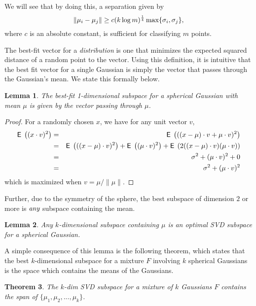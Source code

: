 \documentclass{book}
\newtheorem{theorem}{Theorem}[chapter]
\newtheorem{lemma}[theorem]{Lemma}
\numberwithin{exercise}{chapter}
\begin{document}
We will see that by doing this, a separation given by
\[
\|\mu_i-\mu_j\| \ge c(k\log m)^{\frac{1}{4}}\max\{\sigma_i,\sigma_j\},
\]
where $c$ is an absolute constant, is sufficient for classifying $m$ points.

The best-fit vector for a \emph{distribution}
is one that minimizes the expected squared distance of a random point to the vector.  Using this definition, it is intuitive that
the best fit vector for a single Gaussian is simply the vector that
passes through the Gaussian's mean. We state this formally below.

\begin{lemma}
The best-fit 1-dimensional subspace for a spherical Gaussian with mean $\mu$ is given by the vector passing through $\mu$.
\end{lemma}

\begin{proof}
For a randomly chosen $x$, we have for any unit vector $v$,
\begin{eqnarray*}
\hbox{{\sf E}\;}\left((x\cdot v)^2\right) &=& \hbox{{\sf E}\;}\left(((x-\mu)\cdot v + \mu \cdot v)^2\right) \\
&=& \hbox{{\sf E}\;}\left(((x-\mu)\cdot v)^2\right) + \hbox{{\sf E}\;}\left((\mu \cdot v)^2\right)  + \hbox{{\sf E}\;}\left(2((x-\mu)\cdot v)(\mu \cdot v)\right) \\
&=& \sigma^2 + (\mu \cdot v)^2 + 0 \\
&=& \sigma^2 + (\mu \cdot v)^2 \\
\end{eqnarray*}
which is maximized when $v=\mu/\|\mu\|$.
\end{proof}

Further, due to the symmetry of the sphere,
the best subspace of dimension $2$ or more is
$\emph{any}$ subspace containing the mean.

\begin{lemma}
Any $k$-dimensional subspace containing $\mu$ is an optimal SVD subspace for a spherical Gaussian.
\end{lemma}

A simple consequence of this lemma is the following theorem, which
states that the best $k$-dimensional subspace for a mixture $F$
involving $k$ spherical Gaussians is the space which contains the means of the
Gaussians.

\begin{theorem}\label{thm:svdspansmeans}
The $k$-dim SVD subspace for a mixture of $k$ Gaussians $F$ contains the span of $\{\mu_1,\mu_2,...,\mu_k\}$.
\end{theorem}
\end{document}
